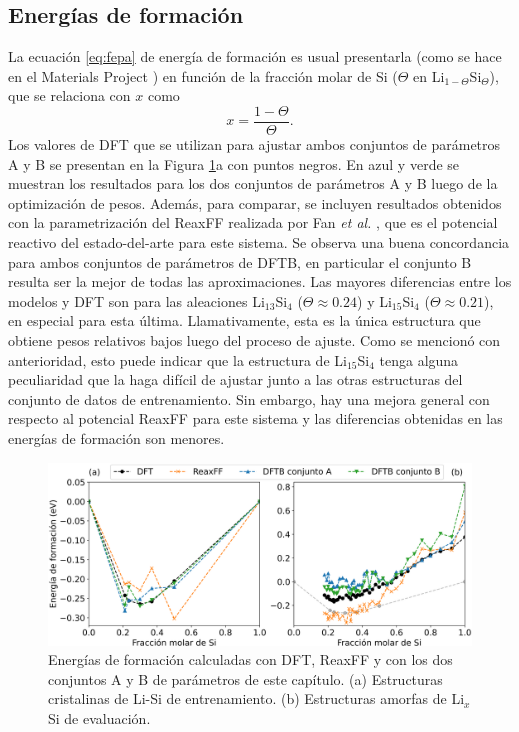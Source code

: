 \subsection{Energías de formación}

La ecuación \ref{eq:fepa} de energía de formación es usual presentarla (como
se hace en el Materials Project \cite{materials_project}) en función
de la fracción molar de Si ($\Theta$ en Li$_{1-\Theta}$Si$_\Theta$), que
se relaciona con $x$ como
\begin{equation}
	x = \frac{1 - \Theta}{\Theta}.
\end{equation}
Los valores de DFT que se utilizan para ajustar ambos conjuntos de parámetros
A y B se presentan en la Figura \ref{fig:eform}a con puntos negros. En azul
y verde se muestran los resultados para los dos conjuntos de parámetros A y B
luego de la optimización de pesos. Además, para comparar, se incluyen resultados
obtenidos con la parametrización del ReaxFF realizada por Fan \textit{et al.}
\cite{fan2013}, que es el potencial reactivo del estado-del-arte para este
sistema. Se observa una buena concordancia para ambos conjuntos de parámetros
de DFTB, en particular el conjunto B resulta ser la mejor de todas las
aproximaciones. Las mayores diferencias entre los modelos y DFT son para las
aleaciones Li$_{13}$Si$_4$ ($\Theta \approx 0.24$) y Li$_{15}$Si$_4$
($\Theta \approx 0.21$), en especial para esta última. Llamativamente, esta es
la única estructura que obtiene pesos relativos bajos luego del proceso de
ajuste. Como se mencionó con anterioridad, esto puede indicar que la estructura
de Li$_{15}$Si$_4$ tenga alguna peculiaridad que la haga difícil de ajustar
junto a las otras estructuras del conjunto de datos de entrenamiento. Sin
embargo, hay una mejora general con respecto al potencial ReaxFF para este
sistema y las diferencias obtenidas en las energías de formación son menores.

\begin{figure}[h]
	\centering
	\includegraphics[width=\textwidth]{Silicio/modelo/resultados/formacion/energias.png}
	\caption{Energías de formación calculadas con DFT, ReaxFF y con los dos
	conjuntos A y B de parámetros de este capítulo. (a) Estructuras cristalinas
	de Li-Si de entrenamiento. (b) Estructuras amorfas de Li$_x$Si de evaluación.}
	\label{fig:eform}
\end{figure}

